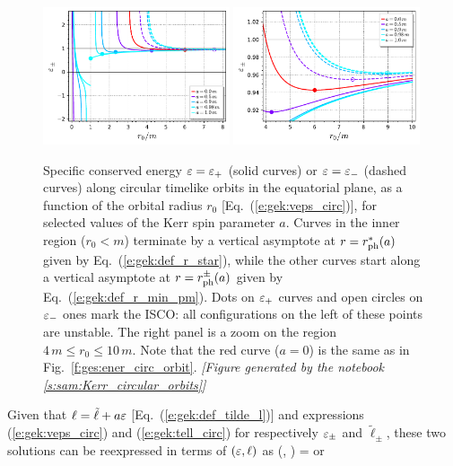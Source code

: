 \begin{figure}
\begin{center}
\includegraphics[width=0.49\textwidth]{gek_eps_circ_orb.pdf}
\includegraphics[width=0.49\textwidth]{gek_eps_circ_orb_zoom.pdf}
\end{center}
\caption[]{\label{f:gek:eps_circ_orb} \footnotesize
Specific conserved energy $\varepsilon=\varepsilon_+$ (solid curves) or $\varepsilon=\varepsilon_-$
(dashed curves) along circular timelike
orbits in the equatorial plane, as a function of the orbital radius $r_0$
[Eq.~(\ref{e:gek:veps_circ})], for selected values of the Kerr spin parameter $a$.
Curves in the inner region ($r_0 < m$) terminate by a vertical asymptote at $r = r_{\rm ph}^*(a)$ given
by Eq.~(\ref{e:gek:def_r_star}), while the other curves start along a
vertical asymptote at $r = r_{\rm ph}^\pm(a)$ given by Eq.~(\ref{e:gek:def_r_min_pm}).
Dots on $\varepsilon_+$ curves and open circles on $\varepsilon_-$ ones mark the ISCO: all
configurations on the left of these points are unstable.
The right panel is a zoom on the region $4\,m \leq r_0 \leq 10\,m$.
Note that the red curve ($a=0$) is the same as in Fig.~\ref{f:ges:ener_circ_orbit}.
\textsl{[Figure generated by the notebook \ref{s:sam:Kerr_circular_orbits}]}
}
\end{figure}
Given that $\ell = \tilde{\ell} + a \varepsilon$ [Eq.~(\ref{e:gek:def_tilde_l})]
and expressions (\ref{e:gek:veps_circ}) and (\ref{e:gek:tell_circ}) for respectively
$\varepsilon_\pm$ and $\tilde{\ell}_\pm$, these two solutions
can be reexpressed in terms of $(\varepsilon,\ell)$ as
\be \label{e:gek:circ_two_sol}
    (\veps, \ell) = \encadre{ (\veps_+, \ell_+)}\quad\mbox{or}\quad
